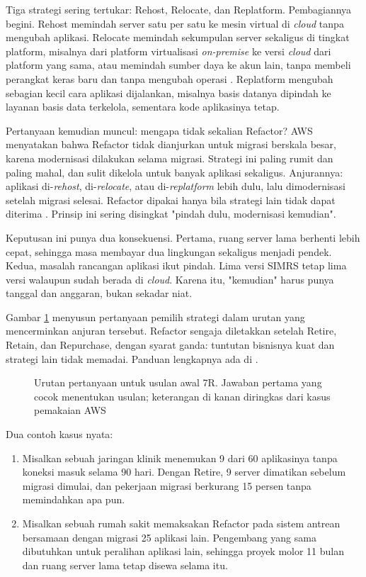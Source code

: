 Tiga strategi sering tertukar: Rehost, Relocate, dan Replatform. Pembagiannya begini.
Rehost memindah server satu per satu ke mesin virtual di \textit{cloud} tanpa mengubah
aplikasi. Relocate memindah sekumpulan server sekaligus di tingkat platform, misalnya dari
platform virtualisasi \textit{on-premise} ke versi \textit{cloud} dari platform yang sama,
atau memindah sumber daya ke akun lain, tanpa membeli perangkat keras baru dan tanpa
mengubah operasi \cite{aws7r}. Replatform mengubah sebagian kecil cara aplikasi
dijalankan, misalnya basis datanya dipindah ke layanan basis data terkelola, sementara
kode aplikasinya tetap.

Pertanyaan kemudian muncul: mengapa tidak sekalian Refactor? AWS menyatakan bahwa Refactor
tidak dianjurkan untuk migrasi berskala besar, karena modernisasi dilakukan selama
migrasi. Strategi ini paling rumit dan paling mahal, dan sulit dikelola untuk banyak
aplikasi sekaligus. Anjurannya: aplikasi di-\textit{rehost}, di-\textit{relocate}, atau
di-\textit{replatform} lebih dulu, lalu dimodernisasi setelah migrasi selesai. Refactor
dipakai hanya bila strategi lain tidak dapat diterima \cite{aws7r}. Prinsip ini sering
disingkat "pindah dulu, modernisasi kemudian".

Keputusan ini punya dua konsekuensi. Pertama, ruang server lama berhenti lebih cepat, sehingga
masa membayar dua lingkungan sekaligus menjadi pendek. Kedua, masalah rancangan aplikasi
ikut pindah. Lima versi SIMRS tetap lima versi walaupun sudah berada di \textit{cloud}.
Karena itu, "kemudian" harus punya tanggal dan anggaran, bukan sekadar niat.

Gambar \ref{fig:ch04-pohon-7r} menyusun pertanyaan pemilih strategi dalam urutan yang
mencerminkan anjuran tersebut. Refactor sengaja diletakkan setelah Retire, Retain, dan
Repurchase, dengan syarat ganda: tuntutan bisnisnya kuat dan strategi lain tidak memadai.
Panduan lengkapnya ada di .

\begin{figure}[!htb]
  \centering
  
  \caption{Urutan pertanyaan untuk usulan awal 7R. Jawaban pertama yang cocok menentukan
           usulan; keterangan di kanan diringkas dari kasus pemakaian AWS}
  \label{fig:ch04-pohon-7r}
\end{figure}

Dua contoh kasus nyata:
\begin{enumerate}
  \item Misalkan sebuah jaringan klinik menemukan 9 dari 60 aplikasinya tanpa koneksi
        masuk selama 90 hari. Dengan Retire, 9 server dimatikan sebelum migrasi dimulai,
        dan pekerjaan migrasi berkurang 15 persen tanpa memindahkan apa pun.
  \item Misalkan sebuah rumah sakit memaksakan Refactor pada sistem antrean bersamaan
        dengan migrasi 25 aplikasi lain. Pengembang yang sama dibutuhkan untuk peralihan
        aplikasi lain, sehingga proyek molor 11 bulan dan ruang server lama tetap disewa
        selama itu.
\end{enumerate}

